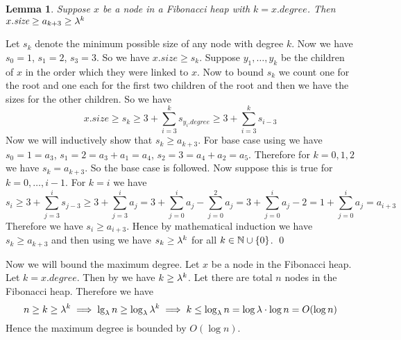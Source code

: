 \documentclass[a4paper, 11pt]{article}
\newtheorem{lemma}{Lemma}
\renewenvironment{proof}{\noindent{\it \textbf{Proof:}}\hspace*{1em}}{\qed\bigskip\\}
\begin{document}
{\begin{lemma}\label{lem3}
	Suppose $x$ be a node in a Fibonacci heap with $k=x.\textit{degree}$.  Then $x.\textit{size}\geq a_{k+3}\geq\lambda^k$
\end{lemma}
\begin{proof}
	Let $s_k$ denote the minimum possible size of any node with degree $k$. Now we have $s_0=1$, $s_1=2$, $s_3=3$. So we have $x.\textit{size}\geq s_k$. Suppose $y_1,\dots, y_k$ be the children of $x$ in the order which they were linked to $x$. Now  to bound $s_k$ we count one for the root and one each for the first two children of the root and then we have the sizes for the other children. So we have $$x.\textit{size}\geq s_k\geq 3+\sum_{i=3}^k s_{y_i.\textit{degree}}\geq 3+\sum_{i=3}^k s_{i-3}$$Now we will inductively show that $s_k\geq a_{k+3}$. For base case using  we have $s_0=1=a_3$, $s_1=2=a_3+a_1=a_4$, $s_2=3=a_4+a_2=a_5$. Therefore for $k=0,1,2$ we have $s_k=a_{k+3}$. So the base case is followed. Now suppose this is true for $k=0,\dots, i-1$. For $k=i$ we have $$s_i\geq 3+\sum_{j=3}^is_{j-3}\geq 3+\sum_{j=3}^i a_{j}=3+\sum_{j=0}^i a_{j}-\sum_{j=0}^2a_j=3+\sum_{j=0}^ia_j-2=1+\sum_{j=0}^ia_j=a_{i+3}$$Therefore we have $s_i\geq a_{i+3}$. Hence by mathematical induction we have $s_k\geq a_{k+3}$ and then using  we have $s_k\geq \lambda^k$ for all $k\in\mathbb{N}\cup \{0\}$.
\end{proof}

Now we will bound the maximum degree. Let $x$ be a node in the Fibonacci heap. Let $k=x.\textit{degree}$.  Then by  we have $k\geq \lambda^k$. Let there are total $n$ nodes in the Fibonacci heap. Therefore we have $$n\geq k\geq \lambda^k\implies \lg_{\lambda}n\geq \log_{\lambda}\lambda^k\implies k\leq \log_{\lambda}n=\log \lambda\cdot \log n=O(\log n)$$Hence the maximum degree is bounded by $O(\log n)$. 
}


\end{document}
